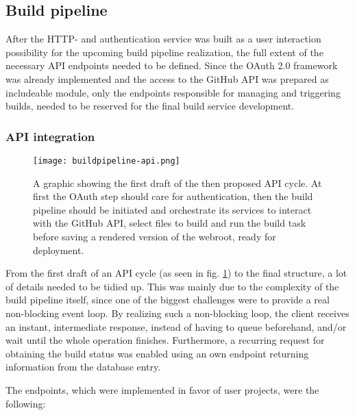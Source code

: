 \subsection{Build pipeline}
\label{sec:structure-buildpipeline}
After the HTTP- and authentication service was built as a user interaction possibility for the upcoming build pipeline realization, the full extent of the necessary API endpoints needed to be defined. Since the OAuth 2.0 framework was already implemented and the access to the GitHub API was prepared as includeable module, only the endpoints responsible for managing and triggering builds, needed to be reserved for the final build service development.

\subsubsection{API integration}

\begin{figure} %
    \centering
    \texttt{[image: buildpipeline-api.png]}
    \caption{A graphic showing the first draft of the then proposed API cycle. At first the OAuth step should care for authentication, then the build pipeline should be initiated and orchestrate its services to interact with the GitHub API, select files to build and run the build task before saving a rendered version of the webroot, ready for deployment.}
    \label{fig:buildpipeline-api}
\end{figure}
%

From the first draft of an API cycle (as seen in fig. \ref{fig:buildpipeline-api}) to the final structure, a lot of details needed to be tidied up. This was mainly due to the complexity of the build pipeline itself, since one of the biggest challenges were to provide a real non-blocking event loop. By realizing such a non-blocking loop, the client receives an instant, intermediate response, instead of having to queue beforehand, and/or wait until the whole operation finishes. Furthermore, a recurring request for obtaining the build status was enabled using an own endpoint returning information from the database entry.

The endpoints, which were implemented in favor of user projects, were the following:


